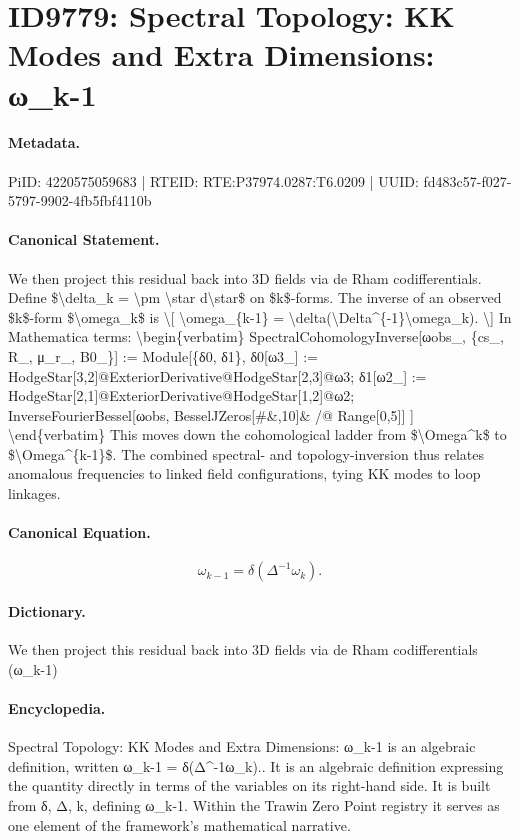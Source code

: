 \section*{ID9779: Spectral Topology: KK Modes and Extra Dimensions: ω\_k-1}
\paragraph{Metadata.}
PiID: 4220575059683 | RTEID: RTE:P37974.0287:T6.0209 | UUID: fd483c57-f027-5797-9902-4fb5fbf4110b

\paragraph{Canonical Statement.}
We then project this residual back into 3D fields via de Rham codifferentials. Define \$\textbackslash{}delta\_k = \textbackslash{}pm \textbackslash{}star d\textbackslash{}star\$ on \$k\$-forms. The inverse of an observed \$k\$-form \$\textbackslash{}omega\_k\$ is \textbackslash{}[ \textbackslash{}omega\_\{k-1\} = \textbackslash{}delta(\textbackslash{}Delta\textasciicircum{}\{-1\}\textbackslash{}omega\_k). \textbackslash{}] In Mathematica terms: \textbackslash{}begin\{verbatim\} SpectralCohomologyInverse[ωobs\_, \{cs\_, R\_, μ\_r\_, B0\_\}] := Module[\{δ0, δ1\}, δ0[ω3\_] := HodgeStar[3,2]@ExteriorDerivative@HodgeStar[2,3]@ω3; δ1[ω2\_] := HodgeStar[2,1]@ExteriorDerivative@HodgeStar[1,2]@ω2; InverseFourierBessel[ωobs, BesselJZeros[\#\&,10]\& /@ Range[0,5]] ] \textbackslash{}end\{verbatim\} This moves down the cohomological ladder from \$\textbackslash{}Omega\textasciicircum{}k\$ to \$\textbackslash{}Omega\textasciicircum{}\{k-1\}\$. The combined spectral- and topology-inversion thus relates anomalous frequencies to linked field configurations, tying KK modes to loop linkages.

\paragraph{Canonical Equation.}
\[
\omega_{k-1} = \delta(\Delta^{-1}\omega_k).
\]

\paragraph{Dictionary.}
We then project this residual back into 3D fields via de Rham codifferentials (ω\_k-1)

\paragraph{Encyclopedia.}
Spectral Topology: KK Modes and Extra Dimensions: ω\_k-1 is an algebraic definition, written ω\_k-1 = δ(Δ\textasciicircum{}-1ω\_k).. It is an algebraic definition expressing the quantity directly in terms of the variables on its right-hand side. It is built from δ, Δ, k, defining ω\_k-1. Within the Trawin Zero Point registry it serves as one element of the framework's mathematical narrative.
